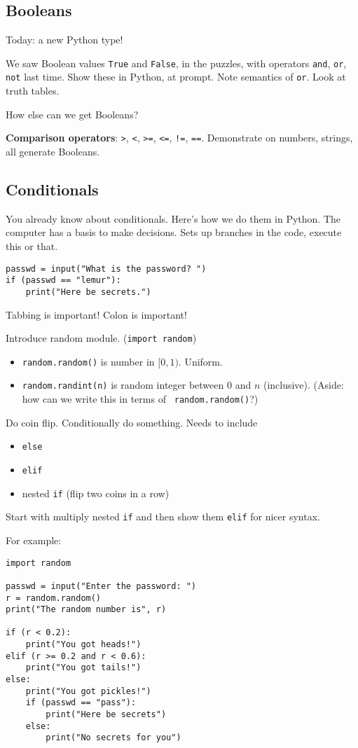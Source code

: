 \documentclass{article}
\begin{document}
\subsection*{Booleans}

Today: a new Python type!

We saw Boolean values {\tt True} and {\tt False}, in the puzzles, with
operators {\tt and}, {\tt or}, {\tt not} last time.  Show these in
Python, at prompt.  Note semantics of {\tt or}.  Look at truth tables.

How else can we get Booleans?

\textbf{Comparison operators}: \verb|>|, \verb|<|, \verb|>=|,
\verb|<=|, \verb|!=|, \verb|==|.  Demonstrate on numbers, strings, all
generate Booleans.

\subsection*{Conditionals}

You already know about conditionals.  Here's how we do them in Python.
The computer has a basis to make decisions.  Sets up branches in the
code, execute this or that.

\begin{verbatim}
passwd = input("What is the password? ")
if (passwd == "lemur"):
    print("Here be secrets.")
\end{verbatim}

Tabbing is important!  Colon is important!

Introduce random module. ({\tt import random})
\begin{itemize}
\item {\tt random.random()} is number in $[0,1)$. Uniform.
\item {\tt random.randint(n)} is random integer between $0$ and $n$
  (inclusive).  (Aside: how can we write this in terms of {\tt
    random.random()}?)
\end{itemize}
Do coin flip.  Conditionally do something.  Needs to include
\begin{itemize}
\item {\tt else}
\item {\tt elif}
\item nested {\tt if}  (flip two coins in a row)
\end{itemize}

Start with multiply nested {\tt if} and then show them {\tt elif} for
nicer syntax.

For example:
\begin{verbatim}
import random

passwd = input("Enter the password: ")
r = random.random()
print("The random number is", r)

if (r < 0.2):
    print("You got heads!")
elif (r >= 0.2 and r < 0.6):
    print("You got tails!")
else:
    print("You got pickles!")
    if (passwd == "pass"):
        print("Here be secrets")
    else:
        print("No secrets for you")
\end{verbatim}
\end{document}
